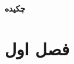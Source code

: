 \documentclass{book}
\begin{document}
 
{\Large \textbf{چکیده}}

	\newpage
	\tableofcontents
	
	
	\chapter{فصل اول}\label{chap1}
	
\end{document}
